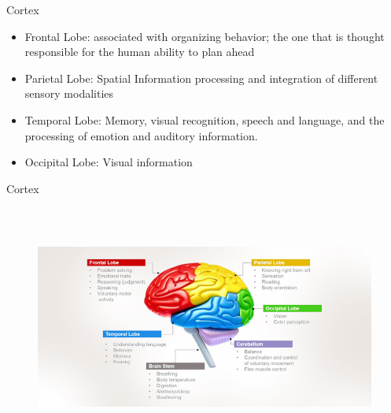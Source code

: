 \documentclass{beamer} %
\begin{document}
\begin{frame}{Cortex}
\begin{itemize}
    \item Frontal Lobe: associated with organizing behavior; the one that is thought responsible for the human ability to plan ahead
    \item Parietal Lobe: Spatial Information processing and integration of different sensory modalities
    \item Temporal Lobe: Memory, visual recognition, speech and language, and the processing of emotion and auditory information. 
    \item Occipital Lobe: Visual information
\end{itemize}
\end{frame}
\begin{frame}{Cortex}
\begin{figure}
    \includegraphics[height = 8cm, keepaspectration]{human-brain-functions.jpg}
\end{figure}
\end{frame}
\end{document}
